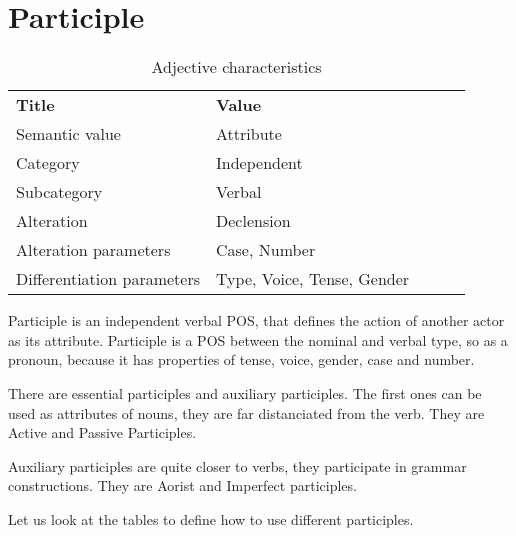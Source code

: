 \section{Participle}

\begin{table}[h]
	\caption{Adjective characteristics}
	\begin{tabular}{lllll}
		\textbf{Title}              & \textbf{Value}               \\
		Semantic value              & Attribute                    \\
		Category                    & Independent                  \\
		Subcategory                 & Verbal                       \\
		Alteration                  & Declension                   \\
		Alteration parameters       & Case, Number                 \\
		Differentiation parameters  & Type, Voice, Tense, Gender
	\end{tabular}
\end{table}

Participle is an independent verbal POS, that defines the action of another actor as its attribute. Participle is a POS between the nominal and verbal type, so as a pronoun, because it has properties of tense, voice, gender, case and number.

There are essential participles and auxiliary participles. The first ones can be used as attributes of nouns, they are far distanciated from the verb. They are Active and Passive Participles.

Auxiliary participles are quite closer to verbs, they participate in grammar constructions. They are Aorist and Imperfect participles.

Let us look at the tables to define how to use different participles.

